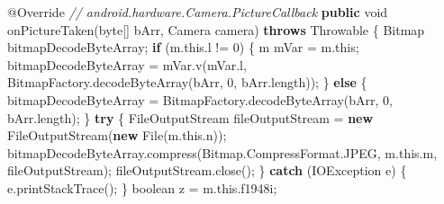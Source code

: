 \documentclass[
]{article}
\newenvironment{Shaded}{}{}
\newcommand{\AttributeTok}[1]{\textcolor[rgb]{0.49,0.56,0.16}{#1}}
\newcommand{\BuiltInTok}[1]{\textcolor[rgb]{0.00,0.50,0.00}{#1}}
\newcommand{\CommentTok}[1]{\textcolor[rgb]{0.38,0.63,0.69}{\textit{#1}}}
\newcommand{\ControlFlowTok}[1]{\textcolor[rgb]{0.00,0.44,0.13}{\textbf{#1}}}
\newcommand{\DataTypeTok}[1]{\textcolor[rgb]{0.56,0.13,0.00}{#1}}
\newcommand{\DecValTok}[1]{\textcolor[rgb]{0.25,0.63,0.44}{#1}}
\newcommand{\FunctionTok}[1]{\textcolor[rgb]{0.02,0.16,0.49}{#1}}
\newcommand{\KeywordTok}[1]{\textcolor[rgb]{0.00,0.44,0.13}{\textbf{#1}}}
\newcommand{\NormalTok}[1]{#1}
\newcommand{\OperatorTok}[1]{\textcolor[rgb]{0.40,0.40,0.40}{#1}}
\begin{document}
\begin{Shaded}
\begin{Highlighting}[]
        \AttributeTok{@Override} \CommentTok{// android.hardware.Camera.PictureCallback}
        \KeywordTok{public} \DataTypeTok{void} \FunctionTok{onPictureTaken}\OperatorTok{(}\DataTypeTok{byte}\OperatorTok{[]}\NormalTok{ bArr}\OperatorTok{,}\NormalTok{ Camera camera}\OperatorTok{)} \KeywordTok{throws} \BuiltInTok{Throwable} \OperatorTok{\{}
\NormalTok{            Bitmap bitmapDecodeByteArray}\OperatorTok{;}
            \ControlFlowTok{if} \OperatorTok{(}\NormalTok{m}\OperatorTok{.}\FunctionTok{this}\OperatorTok{.}\FunctionTok{l} \OperatorTok{!=} \DecValTok{0}\OperatorTok{)} \OperatorTok{\{}
\NormalTok{                m mVar }\OperatorTok{=}\NormalTok{ m}\OperatorTok{.}\FunctionTok{this}\OperatorTok{;}
\NormalTok{                bitmapDecodeByteArray }\OperatorTok{=}\NormalTok{ mVar}\OperatorTok{.}\FunctionTok{v}\OperatorTok{(}\NormalTok{mVar}\OperatorTok{.}\FunctionTok{l}\OperatorTok{,}\NormalTok{ BitmapFactory}\OperatorTok{.}\FunctionTok{decodeByteArray}\OperatorTok{(}\NormalTok{bArr}\OperatorTok{,} \DecValTok{0}\OperatorTok{,}\NormalTok{ bArr}\OperatorTok{.}\FunctionTok{length}\OperatorTok{));}
            \OperatorTok{\}} \ControlFlowTok{else} \OperatorTok{\{}
\NormalTok{                bitmapDecodeByteArray }\OperatorTok{=}\NormalTok{ BitmapFactory}\OperatorTok{.}\FunctionTok{decodeByteArray}\OperatorTok{(}\NormalTok{bArr}\OperatorTok{,} \DecValTok{0}\OperatorTok{,}\NormalTok{ bArr}\OperatorTok{.}\FunctionTok{length}\OperatorTok{);}
            \OperatorTok{\}}
            \ControlFlowTok{try} \OperatorTok{\{}
                \BuiltInTok{FileOutputStream}\NormalTok{ fileOutputStream }\OperatorTok{=} \KeywordTok{new} \BuiltInTok{FileOutputStream}\OperatorTok{(}\KeywordTok{new} \BuiltInTok{File}\OperatorTok{(}\NormalTok{m}\OperatorTok{.}\FunctionTok{this}\OperatorTok{.}\FunctionTok{n}\OperatorTok{));}
\NormalTok{                bitmapDecodeByteArray}\OperatorTok{.}\FunctionTok{compress}\OperatorTok{(}\NormalTok{Bitmap}\OperatorTok{.}\FunctionTok{CompressFormat}\OperatorTok{.}\FunctionTok{JPEG}\OperatorTok{,}\NormalTok{ m}\OperatorTok{.}\FunctionTok{this}\OperatorTok{.}\FunctionTok{m}\OperatorTok{,}\NormalTok{ fileOutputStream}\OperatorTok{);}
\NormalTok{                fileOutputStream}\OperatorTok{.}\FunctionTok{close}\OperatorTok{();}
            \OperatorTok{\}} \ControlFlowTok{catch} \OperatorTok{(}\BuiltInTok{IOException}\NormalTok{ e}\OperatorTok{)} \OperatorTok{\{}
\NormalTok{                e}\OperatorTok{.}\FunctionTok{printStackTrace}\OperatorTok{();}
            \OperatorTok{\}}
            \DataTypeTok{boolean}\NormalTok{ z }\OperatorTok{=}\NormalTok{ m}\OperatorTok{.}\FunctionTok{this}\OperatorTok{.}\FunctionTok{f1948i}\OperatorTok{;}

\end{Highlighting}
\end{Shaded}
\end{document}
